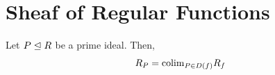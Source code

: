 \documentclass[12pt]{article}
\begin{document}
\section{Sheaf of Regular Functions}

\begin{prop}
    Let $P\trianglelefteq R$ be a prime ideal. Then,
    \[R_P = \mathrm{colim}_{P \in D(f)} R_f\]
\end{prop}
\end{document}
